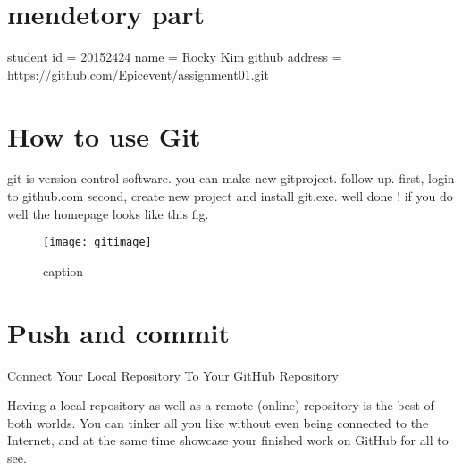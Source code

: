 \documentclass{article}
\begin{document}
\section {mendetory part}
student id = 20152424
name = Rocky Kim
github address = https://github.com/Epicevent/assignment01.git
\section{How to use Git}

git is version control software.
you can make new gitproject.
 follow up.
first, login to github.com
second, create new project and install git.exe.
well done ! if you do well
the homepage looks like this fig.
\begin{figure}
\centering
\texttt{[image: gitimage]}
\caption{caption}
\end{figure}
\section{Push and commit}
Connect Your Local Repository To Your GitHub Repository

Having a local repository as well as a remote (online) repository is the best of both worlds. You can tinker all you like without even being connected to the Internet, and at the same time showcase your finished work on GitHub for all to see.



%
%
\end{document}
